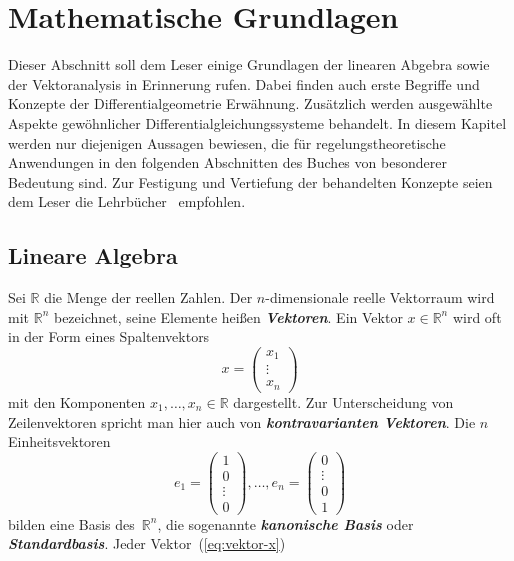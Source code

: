 \chapter{Mathematische Grundlagen\label{cha:Grundlagen}}
Dieser Abschnitt soll dem Leser einige Grundlagen der linearen Abgebra
sowie der Vektoranalysis in Erinnerung rufen. Dabei finden auch erste
Begriffe und Konzepte der Differentialgeometrie Erwähnung. Zusätzlich
werden ausgewählte Aspekte gewöhnlicher Differentialgleichungssysteme
behandelt. In diesem Kapitel werden nur diejenigen Aussagen bewiesen,
die für regelungstheoretische Anwendungen in den folgenden Abschnitten
des Buches von besonderer Bedeutung sind. Zur Festigung und Vertiefung
der behandelten Konzepte seien dem Leser die Lehrbücher~\cite{arnold2001,kerner2007}
empfohlen.
\section{Lineare Algebra\label{sec:Lineare-Algebra}}
Sei ${\mathbb{R}}$ die Menge der reellen Zahlen.
Der $n$-dimensionale reelle
Vektorraum wird mit ${\mathbb{R}}^{n}$ bezeichnet, seine Elemente heißen \textbf{\em Vektoren}.
Ein Vektor $x\in{\mathbb{R}}^{n}$ wird oft in der Form eines Spaltenvektors
\begin{equation}
x=\left(\begin{array}{c}
x_{1}\\
\vdots\\
x_{n}
\end{array}\right)\label{eq:vektor-x}
\end{equation}
mit den Komponenten $x_{1},\ldots,x_{n}\in{\mathbb{R}}$ dargestellt.
Zur Unterscheidung
von Zeilenvektoren spricht man hier auch von \textbf{\em kontravarianten
Vektoren}.
Die $n$ Einheitsvektoren
\[
e_{1}=\left(\begin{array}{c}
1\\
0\\
\vdots\\
0
\end{array}\right),\ldots,e_{n}=\left(\begin{array}{c}
0\\
\vdots\\
0\\
1
\end{array}\right)
\]
bilden eine Basis des~${\mathbb{R}}^{n}$, die sogenannte \textbf{\em kanonische
Basis} oder \textbf{\em Standardbasis}.
Jeder Vektor~(\ref{eq:vektor-x})
